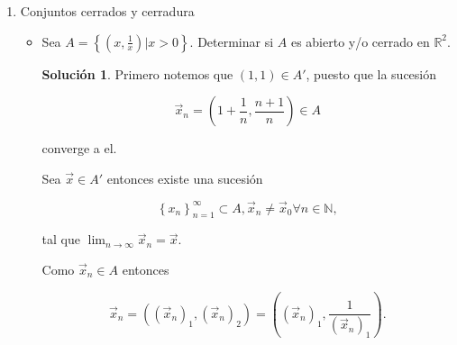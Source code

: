 \documentclass[letterpaper]{article}
\theoremstyle{definition}
\theoremstyle{lemathm}
\theoremstyle{lemathm}
\newtheorem{sol}{Solución}
\theoremstyle{lemathm}
\theoremstyle{lemademthm}
\newcommand{\limtoinf}[1]{\lim_{#1\to\infty}}
\newcommand{\txty}{\text{ y }}
\newcommand{\pars}[1]{\left( #1 \right) }
\newcommand{\norm}[1]{\left\lVert#1\right\rVert}
\newcommand{\set}[1]{\left \{ #1 \right\} }
\newcommand{\NN}{\mathbb{N}}
\newcommand{\RR}{\mathbb{R}}
\newcommand{\1}{\mathbbm{1}}
\begin{document}
\begin{enumerate}
\begin{itemize}
\begin{proof}
				Sea $\epsilon = \min\pars{\epsilon_u,\epsilon_v}$, y $y \in B\pars{x,\epsilon}$ por definición
				
				\[\norm{y-x} < \epsilon,\]
				
				por lo que 
				
				\[\norm{y_u-x_u}^2+\norm{y_v-x_v}^2 < \epsilon^2,\]
				
				como la norma es no negativa obtenemos que
				
				\[\norm{y_u-x_u} < \epsilon \txty \norm{y_v-x_v} < \epsilon,\] 
				
				entonces 
				
				\[y\in B\pars{x_u,\epsilon}\times B\pars{x_v,\epsilon}.\]
				
				Ya que 
				
				\[B\pars{x_u,\epsilon} \subset B\pars{x_u,\epsilon_u} \subset U \txty B\pars{x_v,\epsilon} \subset B\pars{x_v,\epsilon_v} \subset V,\]
				
				entonces $y\in B\pars{x_u,\epsilon}\times B\pars{x_v,\epsilon} \subset U\times V$. Por lo que todo punto en el producto cartesiano de dos abiertos es punto interior y por lo tanto concluimoso que es abierto.

			\end{proof}

		\end{itemize}

		\item Conjuntos cerrados y cerradura
		
		\begin{itemize}
			\item Sea $A = \set{\pars{x,\frac{1}{x}} | x > 0}$. Determinar si $A$ es abierto y/o cerrado en $\RR^2$.
			
			\begin{sol}

				Primero notemos que $(1,1)\in A'$, puesto que la sucesión 
				
				\[\vec{x}_n = \pars{1+\frac{1}{n}, \frac{n+1}{n}} \in A\]
				
				converge a el. 
				
				Sea $\vec{x} \in A'$ entonces existe una sucesión 
				
				\[\set{x_n}_{n=1}^{\infty}\subset A, \vec{x}_n\neq \vec{x}_0 \forall n\in\NN,\]
				
				tal que $\limtoinf{n} \vec{x}_n = \vec{x}$. 
				
				Como $\vec{x}_n\in A$ entonces 
				
				\[\vec{x}_n = \pars{\pars{\vec{x}_n}_1,\pars{\vec{x}_n}_2} = \pars{\pars{\vec{x}_n}_1, \frac{1}{\pars{\vec{x}_n}_1}}.\]
				

\end{sol}
\end{itemize}
\end{enumerate}
\end{document}
